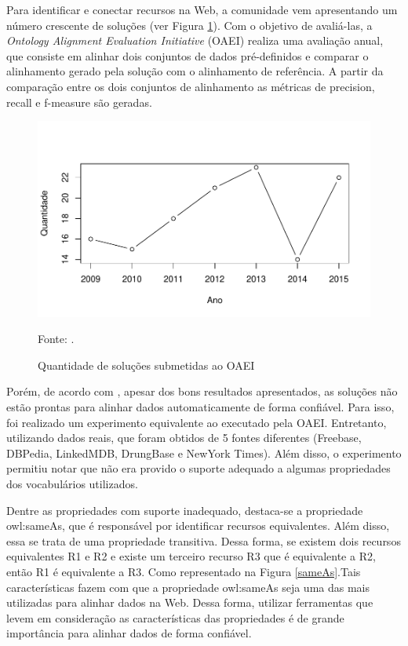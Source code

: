 Para identificar e conectar recursos na Web, a comunidade vem apresentando um número crescente de soluções (ver Figura \ref{fig:oaei_imtools}). Com o objetivo de avaliá-las, a \textit{Ontology Alignment Evaluation Initiative} (OAEI) realiza uma avaliação anual, que consiste em alinhar dois conjuntos de dados pré-definidos e comparar o alinhamento gerado pela solução com o alinhamento de referência. A partir da comparação entre os dois conjuntos de alinhamento as métricas de precision, recall e f-measure são geradas.

\begin{figure}[!ht]
	\centering
	\includegraphics[width=1\textwidth]{./imagens/im_tools.pdf}
    \caption{Quantidade de soluções submetidas ao OAEI}
	\footnotesize{Fonte: \cite{cheatham2015results}.}
	\label{fig:oaei_imtools}
\end{figure}

Porém, de acordo com , apesar dos bons resultados apresentados, as soluções não estão prontas para alinhar dados automaticamente de forma confiável. Para isso, foi realizado um experimento equivalente ao executado pela OAEI. Entretanto, utilizando dados reais, que foram obtidos de 5 fontes diferentes (Freebase, DBPedia, LinkedMDB, DrungBase e NewYork Times). Além disso, o experimento permitiu notar que não era provido o suporte adequado a algumas propriedades dos vocabulários utilizados.
	
Dentre as propriedades com suporte inadequado, destaca-se a propriedade owl:sameAs, que é responsável por identificar recursos equivalentes. Além disso, essa se trata de uma propriedade transitiva. Dessa forma, se existem dois recursos equivalentes R1 e R2 e existe um terceiro recurso R3 que é equivalente a R2, então R1 é equivalente a R3. Como representado na Figura \ref{sameAs}.Tais características fazem com que a propriedade owl:sameAs seja uma das  mais utilizadas para alinhar dados na Web. Dessa forma, utilizar ferramentas que levem em consideração as características das propriedades é de grande importância para alinhar dados de forma confiável.

